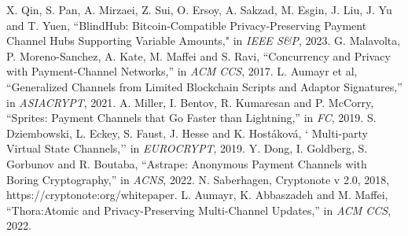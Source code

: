 \documentclass[conference]{IEEEtran}
\begin{document}
\begin{thebibliography}{99}
 X. Qin, S. Pan, A. Mirzaei, Z. Sui, O. Ersoy, A. Sakzad, M. Esgin, J. Liu, J. Yu and T. Yuen, ``BlindHub: Bitcoin-Compatible Privacy-Preserving Payment Channel Hubs Supporting Variable Amounts," in \textit{IEEE S\&P}, 2023.
 G. Malavolta, P. Moreno-Sanchez, A. Kate, M. Maffei and S. Ravi, ``Concurrency and Privacy with Payment-Channel Networks,'' in \textit{ACM CCS}, 2017.
 L. Aumayr et al, ``Generalized Channels from Limited Blockchain Scripts and Adaptor Signatures,'' in \textit{ASIACRYPT}, 2021.
 A. Miller, I. Bentov, R. Kumaresan and P. McCorry, ``Sprites: Payment Channels that Go Faster than Lightning,'' in \textit{FC}, 2019. 
 S. Dziembowski, L. Eckey, S. Faust, J. Hesse and K. Hostáková, ` Multi-party Virtual State Channels,'' in \textit{EUROCRYPT}, 2019.
 Y. Dong, I. Goldberg, S. Gorbunov and R. Boutaba, ``Astrape: Anonymous Payment Channels with Boring Cryptography,'' in \textit{ACNS}, 2022.
 N. Saberhagen, Cryptonote v 2.0, 2018, https://cryptonote:org/whitepaper.  
 L. Aumayr, K. Abbaszadeh and M. Maffei, ``Thora:Atomic and Privacy-Preserving Multi-Channel Updates,'' in \textit{ACM CCS}, 2022.
\end{thebibliography}
\end{document}
